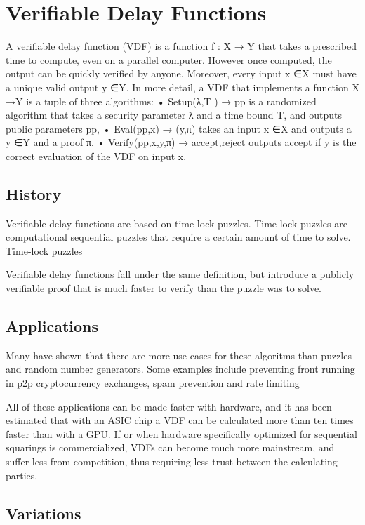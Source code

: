 \chapter{Verifiable Delay Functions}
\label{Verifiable Delay Functions}
A verifiable delay function (VDF) is a function f : X → Y that takes a prescribed time to compute, even on a parallel computer. However once computed, the output can be quickly verified by anyone. Moreover, every input x ∈X must have a unique valid output y ∈Y. In more detail, a VDF that implements a function X →Y is a tuple of three algorithms: • Setup(λ,T ) → pp is a randomized algorithm that takes a security parameter λ and a time bound T, and outputs public parameters pp, • Eval(pp,x) → (y,π) takes an input x ∈X and outputs a y ∈Y and a proof π. • Verify(pp,x,y,π) → {accept,reject} outputs accept if y is the correct evaluation of the VDF on input x.

\section{History}
Verifiable delay functions are based on time-lock puzzles. Time-lock puzzles are computational sequential puzzles that require a certain amount of time to solve.\cite{rivest_time-lock_nodate} Time-lock puzzles

Verifiable delay functions fall under the same definition, but introduce a publicly verifiable proof that is much faster to verify than the puzzle was to solve.

\section{Applications}

Many have shown that there are more use cases for these algoritms than puzzles and random number generators. Some examples include preventing front running in p2p cryptocurrency exchanges, spam prevention and rate limiting\cite{vdfresearch}

All of these applications can be made faster with hardware, and it has been estimated that with an ASIC chip a VDF can be calculated more than ten times faster than with a GPU. If or when hardware specifically optimized for sequential squarings is commercialized, VDFs can become much more mainstream, and suffer less from competition, thus requiring less trust between the calculating parties.

\section{Variations}


